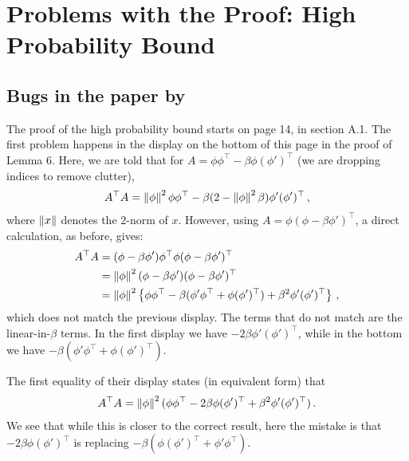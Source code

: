 \documentclass{article}
\begin{document}
\section{Problems with the Proof: High Probability Bound}
\subsection{Bugs in the paper by \cite{flstda}}
The proof of the high probability bound starts on page 14, in section A.1.
The first problem happens in the display on the bottom of this page in the proof of Lemma 6.
Here, we are told that for $A = \phi \phi^\top - \beta \phi (\phi')^\top$ (we are dropping indices to remove clutter),
\begin{align*}
A^\top A = \left\| \phi\right\|^2 \phi \phi^\top - \beta ( 2 - \left\| \phi\right\|^2\beta ) \phi' (\phi')^\top\,,
\end{align*}
where $\left\| x\right\|$ denotes the $2$-norm of $x$.
However, using $A = \phi( \phi-\beta \phi')^\top$, a direct calculation, as before, gives:
\begin{align*}
A^\top A 
& = ( \phi-\beta \phi') \phi^\top \phi ( \phi-\beta \phi')^\top \\
& = \left\| \phi\right\|^2  ( \phi-\beta \phi') ( \phi-\beta \phi')^\top \\
& = \left\| \phi\right\|^2  \left\{ \phi \phi^\top-\beta (\phi' \phi^\top + \phi (\phi')^\top) + \beta^2 \phi' (\phi')^\top \right\}\,,
\end{align*}
which does not match the previous display.
The terms that do not match are the linear-in-$\beta$ terms.
In the first display we have $ -2 \beta \phi' (\phi')^\top$, while in the bottom we have $-\beta (\phi' \phi^\top + \phi (\phi')^\top)$.

The first equality of their display states (in equivalent form) that 
\begin{align*}
A^\top A = \left\| \phi\right\|^2 ( \phi \phi^\top - 2\beta \phi (\phi')^\top +\beta^2 \phi' (\phi')^\top )\,.
\end{align*}
We see that while this is closer to the correct result, here the mistake is that $-2\beta \phi  (\phi')^\top$ is replacing $-\beta(\phi (\phi')^\top + \phi' \phi^\top)$.
\begin{comment}
We also have a hard time following the rest of the proof of this lemma.
In fact, we have a simple proof for a result similar to stated in this lemma.
This works by observing that one needs to 
bound the Lipschitz factor of $\theta \mapsto \bar T_n \dots \bar T_{t+1} ( (I-\gamma_t A_t)\theta + b_t )$, where
$A_t = \phi_t (\phi_t -\beta \phi_t')^\top$, $b_t = r_{i_t} \phi_t$ and
 $\bar T_t(\theta) = (I-\gamma_t \bar A_T) \theta + \bar b_T$ (we assume that the stepsize sequence is deterministic).
 Clearly, this Lipschitz factor can be bounded by $\prod_{s=t+1}^n \norm{I-\gamma_s \bar A_T}_2 \norm{I-\gamma_t A_t}_2$
 (the composition of Lipschitz maps is Lipschitz with a factor that is the product of the individual maps' Lipschitz factors). 
Invoking (A3) then indeed gives some version of Lemma 7.
By making an appropriate assumption (similar to those used in our paper), 
$\prod_{s=t+1}^n \norm{I-\gamma_s \bar A_T}_2 $ can be controlled.
\end{comment}
\end{document}
